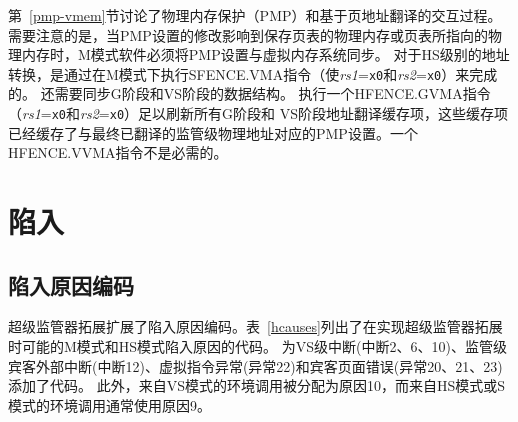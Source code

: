 第~\ref{pmp-vmem}节讨论了物理内存保护（PMP）和基于页地址翻译的交互过程。
需要注意的是，当PMP设置的修改影响到保存页表的物理内存或页表所指向的物理内存时，M模式软件必须将PMP设置与虚拟内存系统同步。
对于HS级别的地址转换，是通过在M模式下执行SFENCE.VMA指令（使{\em rs1}={\tt x0}和{\em rs2}={\tt x0}）来完成的。
还需要同步G阶段和VS阶段的数据结构。
执行一个HFENCE.GVMA指令（{\em rs1}={\tt x0}和{\em rs2}={\tt x0}）足以刷新所有G阶段和
VS阶段地址翻译缓存项，这些缓存项已经缓存了与最终已翻译的监管级物理地址对应的PMP设置。一个HFENCE.VVMA指令不是必需的。

\section{陷入}

\subsection{陷入原因编码}

超级监管器拓展扩展了陷入原因编码。表~\ref{hcauses}列出了在实现超级监管器拓展时可能的M模式和HS模式陷入原因的代码。
为VS级中断(中断2、6、10)、监管级宾客外部中断(中断12)、虚拟指令异常(异常22)和宾客页面错误(异常20、21、23)添加了代码。
此外，来自VS模式的环境调用被分配为原因10，而来自HS模式或S模式的环境调用通常使用原因9。

